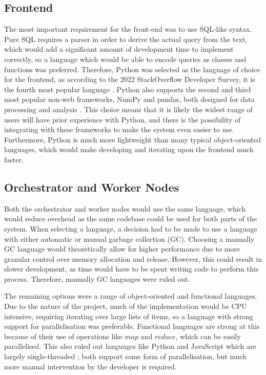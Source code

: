 \subsection{Frontend}\label{subsec:frontend-design}
The most important requirement for the front-end was to use SQL-like syntax. Pure SQL requires a parser in order to derive the actual query from the text, which would add a significant amount of development time to implement correctly, so a language which would be able to encode queries as classes and functions was preferred.
Therefore, Python  was selected as the language of choice for the frontend, as according to the 2022 StackOverflow Developer Survey, it is the fourth most popular language \cite{stackoverflowsurvey2022}. Python also supports the second and third most popular non-web frameworks, NumPy and pandas, both designed for data processing and analysis  \cite{reback2020pandas} . This choice means that it is likely the widest range of users will have prior experience with Python, and there is the possibility of integrating with these frameworks to make the system even easier to use. Furthermore, Python is much more lightweight than many typical object-oriented languages, which would make developing and iterating upon the frontend much faster.

\subsection{Orchestrator and Worker Nodes}
Both the orchestrator and worker nodes would use the same language, which would reduce overhead as the same codebase could be used for both parts of the system. When selecting a language, a decision had to be made to use a language with either automatic or manual garbage collection (GC). Choosing a manually GC language would theoretically allow for higher  performance due to more granular control over memory allocation and release. However, this could result in slower development, as time would have to be spent writing code to perform this process. Therefore, manually GC languages were ruled out.

The remaining options were a range of object-oriented and functional languages. Due to the nature of the project, much of the implementation would be CPU intensive, requiring iterating over large lists of items, so a language with strong support for parallelisation was preferable. Functional languages are strong at this because of their use of operations like $map$ and $reduce$, which can be easily parallelised. This also ruled out languages like Python  and JavaScript  which are largely single-threaded ; both support some form of parallelisation, but much more manual intervention by the developer is required.

